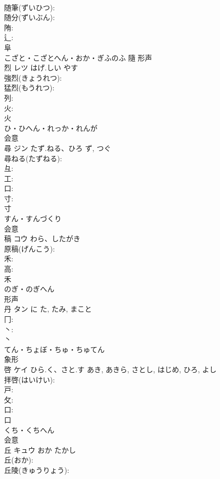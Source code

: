 \documentclass[8pt]{extreport}
\begin{document}
\begin{CJK}{UTF8}{min}
\\	随筆(ずいひつ): 
\\	随分(ずいぶん): 
\\	陏: 
\\	辶: 
\\	阜	
\\	こざと・こざとへん・おか・ぎふのふ	隨	形声 
\\	烈	レツ	はげ.しい	やす	
\\	強烈(きょうれつ): 
\\	猛烈(もうれつ): 
\\	列: 
\\	火: 
\\	火	
\\	ひ・ひへん・れっか・れんが	
\\	会意 
\\	尋	ジン	たず.ねる、ひろ	ず, つぐ	
\\	尋ねる(たずねる): 
\\	彑: 
\\	工: 
\\	口: 
\\	寸: 
\\	寸	
\\	すん・すんづくり	
\\	会意 
\\	稿	コウ	わら、したがき		
\\	原稿(げんこう): 
\\	禾: 
\\	高: 
\\	禾	
\\	のぎ・のぎへん	
\\	形声 
\\	丹	タン	に	た, たみ, まこと	
\\	冂: 
\\	丶: 
\\	丶	
\\	てん・ちょぼ・ちゅ・ちゅてん	
\\	象形 
\\	啓	ケイ	ひら.く、さと.す	あき, あきら, さとし, はじめ, ひろ, よし	
\\	拝啓(はいけい): 
\\	戸: 
\\	攵: 
\\	口: 
\\	口	
\\	くち・くちへん	
\\	会意 
\\	丘	キュウ	おか	たかし	
\\	丘(おか): 
\\	丘陵(きゅうりょう): 

\end{CJK}
\end{document}
